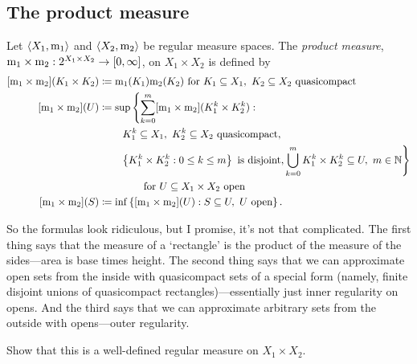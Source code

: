 \subsection{The product measure}

\begin{dfn}
Let $\langle X_1,\mathrm{m} _1\rangle$ and $\langle X_2,\mathrm{m} _2\rangle$ be regular measure spaces.  The \emph{product measure}, $\mathrm{m} _1\times \mathrm{m} _2:2^{X_1\times X_2}\rightarrow [0,\infty ]$, on $X_1\times X_2$ is defined by
\begin{equation}
\begin{split}
[\meas _1\times \meas _2](K_1\times K_2) & \coloneqq \meas _1(K_1)\meas _2(K_2)\text{ for }K_1\subseteq X_1,\ K_2\subseteq X_2\text{ quasicompact} \\
[\meas _1\times \meas _2](U) & \coloneqq \sup \left\{ \sum _{k=0}^m[\meas _1\times \meas _2](K_1^k\times K_2^k):\right. \\
& \qquad \left. K_1^k\subseteq X_1,\ K_2^k\subseteq X_2\text{ quasicompact},\right. \\
& \qquad \left. \left\{ K_1^k\times K_2^k:0\leq k\leq m\right\} \text{ is disjoint}, \bigcup _{k=0}^mK_1^k\times K_2^k\subseteq U,\ m\in \N \right\} \\
& \qquad \qquad \text{ for }U\subseteq X_1\times X_2\text{ open} \\
[\meas _1\times \meas _2](S) & \coloneqq \inf \left\{ [\meas _1\times \meas _2](U):S\subseteq U,\ U\text{ open}\right\} .
\end{split}
\end{equation}
\begin{rmk}
So the formulas look ridiculous, but I promise, it's not that complicated.  The first thing says that the measure of a `rectangle' is the product of the measure of the sides---area is base times height.  The second thing says that we can approximate open sets from the inside with quasicompact sets of a special form (namely, finite disjoint unions of quasicompact rectangles)---essentially just inner regularity on opens.  And the third says that we can approximate arbitrary sets from the outside with opens---outer regularity.
\end{rmk}
\begin{exr}
Show that this is a well-defined regular measure on $X_1\times X_2$.
\end{exr}
\end{dfn}
